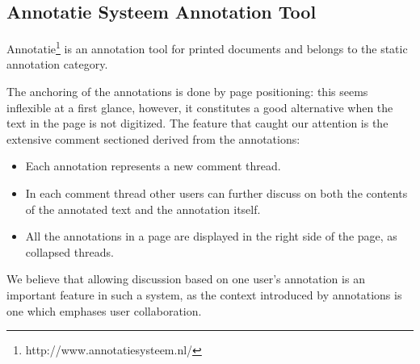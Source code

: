 
\subsection{Annotatie Systeem Annotation Tool} %
Annotatie\footnote{http://www.annotatiesysteem.nl/} is an annotation tool for printed
documents and belongs to the static annotation category.\vspace{10pt}

The anchoring of the annotations is done by page positioning: this seems inflexible at a
first glance, however, it constitutes a good alternative when the text in the page is not
digitized.  The feature that caught our attention is the extensive comment sectioned
derived from the annotations:
\begin{itemize}
\item Each annotation represents a new comment thread.
\item In each comment thread other users can further discuss on both the contents of the
  annotated text and the annotation itself.
\item All the annotations in a page are displayed in the right side of the page, as
  collapsed threads.
\end{itemize}
We believe that allowing discussion based on one user's annotation is an important feature
in such a system, as the context introduced by annotations is one which emphases user
collaboration.


